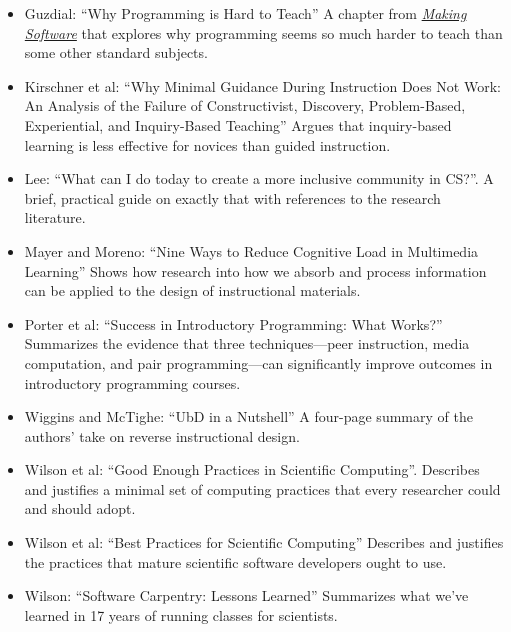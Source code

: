 \begin{itemize}
\item
  Guzdial:
``Why Programming is Hard to Teach''
A chapter from
\emph{\href{http://www.amazon.com/Making-Software-Really-Works-Believe/dp/0596808321/}{Making
Software}} that explores why programming seems so much harder to teach
than some other standard subjects.

\item
  Kirschner et al:
``Why Minimal Guidance During Instruction Does Not Work:
An Analysis of the Failure of Constructivist, Discovery, Problem-Based, Experiential, and Inquiry-Based Teaching''
Argues that inquiry-based learning is less effective for novices than
guided instruction.

\item
  Lee:
``What can I do today to create a more inclusive community in CS?''.
A brief, practical guide on exactly that with references to the research
literature.

\item
  Mayer and Moreno:
``Nine Ways to Reduce Cognitive Load in Multimedia Learning''
Shows how research into how we absorb and process information can be
applied to the design of instructional materials.

\item
  Porter et al:
``Success in Introductory Programming: What Works?''
Summarizes the evidence that three techniques---peer instruction, media
computation, and pair programming---can significantly improve outcomes
in introductory programming courses.

\item
  Wiggins and McTighe:
``UbD in a Nutshell''
A four-page summary of the authors' take on reverse instructional
design.

\item
  Wilson et al: ``Good Enough Practices in Scientific Computing''.
Describes and justifies a minimal set of computing practices that every
researcher could and should adopt.

\item
  Wilson et al:
``Best Practices for Scientific Computing''
Describes and justifies the practices that mature scientific software
developers ought to use.

\item
  Wilson:
``Software Carpentry: Lessons Learned''
Summarizes what we've learned in 17 years of running classes for
scientists.

\end{itemize}
